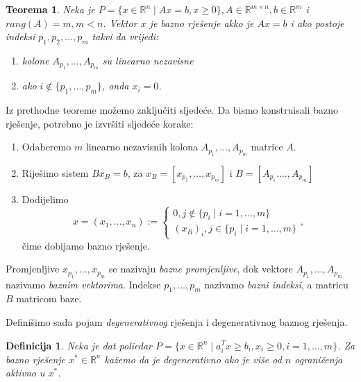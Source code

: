 \documentclass[b5paper, utf8, 11pt, colorlinks]{book}
\newtheorem{definition}{Definicija}[chapter]
\newtheorem{thm}{Teorema}[chapter]
\theoremstyle{definition}
\begin{document}
\begin{thm}
   Neka je $P = \{ x \in \mathbb{R}^n \mid A x = b, x \geq 0\}, A \in \mathbb{R}^{m \times n}, b \in \mathbb{R}^m$ i $rang(A)= m, m < n$.
   Vektor $x$ je bazno rješenje  akko je $A x = b$ i ako postoje indeksi $p_1,p_2,\ldots, p_m$ takvi da vrijedi:
   \begin{enumerate}
       \item kolone $A_{p_1},\ldots, A_{p_m}$ su linearno nezavisne
       \item ako $i \notin \{p_1,\ldots, p_m\}$, onda $x_i = 0$.
   \end{enumerate}
   
\end{thm}
Iz prethodne teoreme možemo zaključiti sljedeće.  Da bismo  konstruisali bazno rješenje, potrebno je izvršiti sljedeće korake:
\begin{enumerate}
    \item Odaberemo $m$ linearno nezavisnih kolona $A_{p_1}, \ldots, A_{p_m}$ matrice $A$.
    \item Riješimo sistem $B x_B = b$, za $x_B = [x_{p_1}, \ldots, x_{p_m}]$ i $B= [A_{p_1}. \ldots, A_{p_m}]$
    \item Dodijelimo $$x = (x_1,\ldots, x_n):= \begin{cases}
    	          0, j  \not   \in \{ p_i \mid i=1,\ldots, m\} \\
    	          (x_B)_i, j \in \{ p_i \mid i=1,\ldots, m\}
    \end{cases},$$  čime dobijamo bazno rješenje. 

\end{enumerate} 
 
Promjenljive $x_{p_1},\ldots, x_{p_m}$ se nazivaju \emph{bazne promjenljive}, dok vektore $A_{p_1}, \ldots, A_{p_m}$ nazivamo \emph{baznim vektorima}. Indekse $p_1,\ldots, p_m$ nazivamo \emph{bazni indeksi}, a matricu $B$ matricom baze. 


Definišimo sada pojam \emph{degenerativnog} rješenja i degenerativnog baznog rješenja. 

\begin{definition}
      Neka je dat poliedar $P = \{ x \in \mathbb{R}^n \mid a_i^T x \geq b_i, x_i \geq 0, i=1,\ldots,m \}$. Za bazno rješenje $x^*\in \mathbb{R}^n$ kažemo da je degenerativno ako je više od $n$  ograničenja aktivno u $x^*$. 
      
\end{definition}
\end{document}
